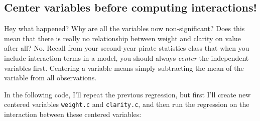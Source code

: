\documentclass[]{book}
\newenvironment{Shaded}{\begin{snugshade}}{\end{snugshade}}
\newcommand{\KeywordTok}[1]{\textcolor[rgb]{0.13,0.29,0.53}{\textbf{#1}}}
\newcommand{\DataTypeTok}[1]{\textcolor[rgb]{0.13,0.29,0.53}{#1}}
\newcommand{\StringTok}[1]{\textcolor[rgb]{0.31,0.60,0.02}{#1}}
\newcommand{\CommentTok}[1]{\textcolor[rgb]{0.56,0.35,0.01}{\textit{#1}}}
\newcommand{\OperatorTok}[1]{\textcolor[rgb]{0.81,0.36,0.00}{\textbf{#1}}}
\newcommand{\NormalTok}[1]{#1}
\theoremstyle{definition}
\theoremstyle{definition}
\theoremstyle{remark}
\begin{document}
\begin{Shaded}
\end{Shaded}

\subsection{Center variables before computing
interactions!}\label{center-variables-before-computing-interactions}

Hey what happened? Why are all the variables now non-significant? Does
this mean that there is really no relationship between weight and
clarity on value after all? No. Recall from your second-year pirate
statistics class that when you include interaction terms in a model, you
should always \emph{center} the independent variables first. Centering a
variable means simply subtracting the mean of the variable from all
observations.

In the following code, I'll repeat the previous regression, but first
I'll create new centered variables \texttt{weight.c} and
\texttt{clarity.c}, and then run the regression on the interaction
between these centered variables:
\end{document}
